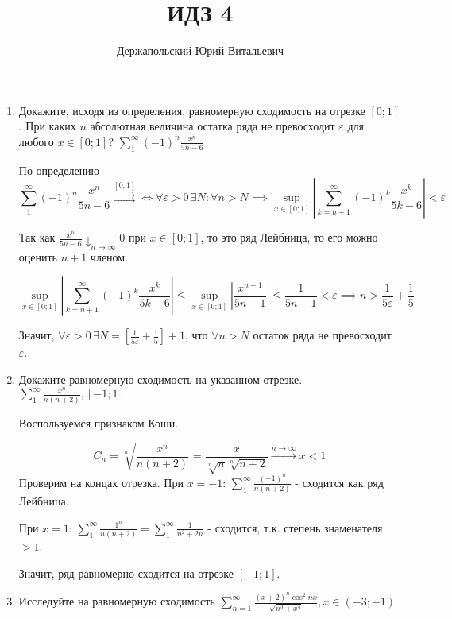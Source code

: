 \documentclass{article}
\title{ИДЗ 4}
\author{Держапольский Юрий Витальевич}
\date{}
\begin{document}
\begin{large}
\maketitle

\begin{enumerate}

\item Докажите, исходя из определения, равномерную сходимость на отрезке 
$[0;1]$. При каких $n$ абсолютная величина остатка ряда не превосходит 
$\varepsilon$ для любого $x \in [0;1]$?
$ \sum\limits_{1}^{\infty}(-1)^n \frac{x^n}{5n-6}$

По определению
$$ \sum\limits_{1}^{\infty}(-1)^n \frac{x^n}{5n-6} \stackrel{[0;1]}{\rightrightarrows} \Leftrightarrow 
\forall \varepsilon > 0 \, \exists N: \forall n > N \implies \sup_{x\in[0;1]} \left|\sum_{k=n+1}^{\infty}(-1)^k \frac{x^k}{5k-6} \right| < \varepsilon $$

Так как $ \frac{x^n}{5n-6} \downarrow_{n\to\infty}0 $ при $ x \in [0;1] $, то это ряд Лейбница, то его можно оценить $n+1$ членом. 

$$ \sup_{x\in[0;1]} \left|\sum_{k=n+1}^{\infty}(-1)^k \frac{x^k}{5k-6} \right| \leq \sup_{x\in[0;1]} \left|\frac{x^{n+1}}{5n-1} \right| \leq \frac{1}{5n-1} < \varepsilon \implies n > \frac{1}{5\varepsilon} + \frac{1}{5} $$

Значит, $ \forall \varepsilon > 0 \, \exists N = \left[ \frac{1}{5\varepsilon} + \frac{1}{5} \right] + 1$, что $\forall n > N$ остаток ряда не превосходит $\varepsilon$.

\item Докажите равномерную сходимость на указанном отрезке. $ \sum\limits_{1}^{\infty} \frac{x^n}{n(n+2)}, [-1;1] $

Воспользуемся признаком Коши.

$$ C_n = \sqrt[n]{ \frac{x^n}{n(n+2)} } = \frac{x}{ \sqrt[n]{n} \sqrt[n]{n+2}} \xrightarrow{n\to\infty} x < 1 $$
Проверим на концах отрезка. При $x = -1$: $ \sum\limits_{1}^{\infty} \frac{(-1)^n}{n(n+2)} $ - сходится как ряд Лейбница.

При $x = 1$: $ \sum\limits_{1}^{\infty} \frac{1^n}{n(n+2)} = \sum\limits_{1}^{\infty} \frac{1}{n^2+2n} $ - сходится, т.к. степень знаменателя $> 1$.

Значит, ряд равномерно сходится на отрезке $[-1;1]$.

\item Исследуйте на равномерную сходимость $ \sum\limits_{n=1}^{\infty} \frac{(x+2)^n \cos^2nx}{\sqrt{n^3 + x^4}}, x \in (-3;-1) $


\end{enumerate}
\end{large}
\end{document}
